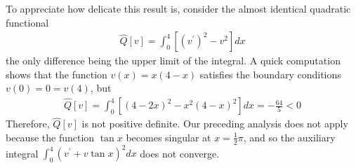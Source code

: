 \documentclass{article}
\begin{document}
\begin{rema}
To appreciate how delicate this result is, consider the almost identical quadratic functional
\begin{align}
\widehat{Q}[v]=\int_{0}^{4}\left[\left(v^{\prime}\right)^{2}-v^{2}\right] d x\label{eq:dincdfafd}
\end{align}
the only difference being the upper limit of the integral. A quick computation shows that the function $v(x)=x(4-x)$ satisfies the boundary conditions $v(0)=0=v(4)$, but
\begin{align*}
\widehat{Q}[v]=\int_{0}^{4}\left[(4-2 x)^{2}-x^{2}(4-x)^{2}\right] d x=-\frac{64}{5}<0
\end{align*}
Therefore, $\widehat{Q}[v]$ is not positive definite. Our preceding analysis does not apply because the function $\tan x$ becomes singular at $x=\frac{1}{2} \pi$, and so the auxiliary integral $\int_{0}^{4}\left(v^{\prime}+v \tan x\right)^{2} d x$ does not converge.
\end{rema}
\end{document}
